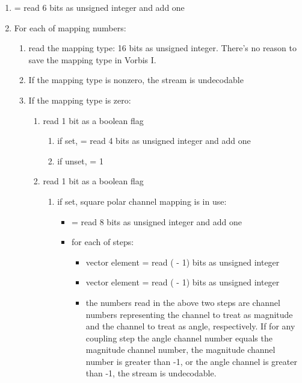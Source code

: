 \begin{enumerate}
 \item {} = read 6 bits as unsigned integer and add one
 \item For each \varname{[i]} of  mapping numbers:
  \begin{enumerate}
   \item read the mapping type: 16 bits as unsigned integer.  There's no reason to save the mapping type in Vorbis I.
   \item If the mapping type is nonzero, the stream is undecodable
   \item If the mapping type is zero:
    \begin{enumerate}
     \item read 1 bit as a boolean flag
      \begin{enumerate}
       \item if set,  = read 4 bits as unsigned integer and add one
       \item if unset,  = 1
      \end{enumerate}


     \item read 1 bit as a boolean flag
       \begin{enumerate}
         \item if set, square polar channel mapping is in use:
           \begin{itemize}
             \item {} = read 8 bits as unsigned integer and add one
             \item for \varname{[j]} each of  steps:
               \begin{itemize}
                 \item vector  element \varname{[j]}= read ( - 1) bits as unsigned integer
                 \item vector  element \varname{[j]}= read ( - 1) bits as unsigned integer
                 \item the numbers read in the above two steps are channel numbers representing the channel to treat as magnitude and the channel to treat as angle, respectively.  If for any coupling step the angle channel number equals the magnitude channel number, the magnitude channel number is greater than -1, or the angle channel is greater than -1, the stream is undecodable.
               \end{itemize}



\end{itemize}
\end{enumerate}
\end{enumerate}
\end{enumerate}
\end{enumerate}
